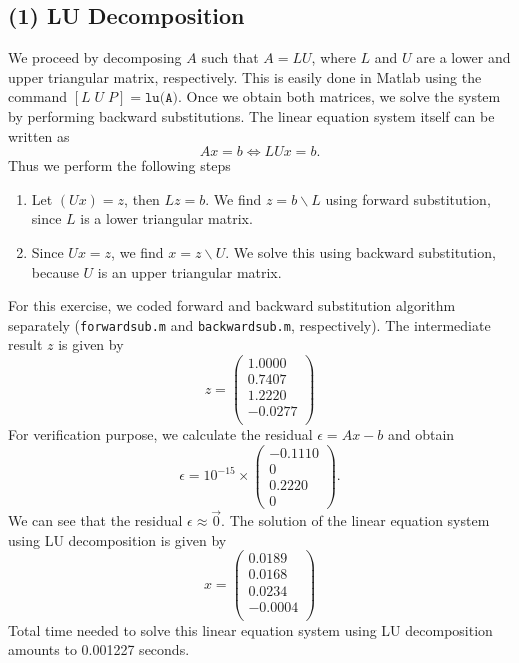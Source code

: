\documentclass[11pt]{article}
\newcommand{\1}{\mathbbm{1}}
\begin{document}
\subsection*{(1) LU Decomposition}
We proceed by decomposing $A$ such that $A=LU$, where $L$ and $U$ are a lower and upper triangular matrix, respectively. This is easily done in Matlab using the command $[L \; U \; P] = \texttt{lu(A)}$. Once we obtain both matrices, we solve the system by performing backward substitutions. The linear equation system itself can be written as 
\[Ax=b \Leftrightarrow LUx =b.\]
Thus we perform the following steps
\begin{enumerate}
	\item Let $(Ux) =z$, then $Lz=b$. We find $z = b\backslash L$ using forward substitution, since $L$ is a lower triangular matrix.
	\item Since $Ux = z$, we find $x=z\backslash U$. We solve this using backward substitution, because $U$ is an upper triangular matrix.
\end{enumerate} 
For this exercise, we coded forward and backward substitution algorithm separately (\texttt{forwardsub.m} and \texttt{backwardsub.m}, respectively). The intermediate result $z$ is given by
\[
z = \begin{pmatrix}
	1.0000\\
	0.7407\\
	1.2220\\
	-0.0277\\
\end{pmatrix}
\]
For verification purpose, we calculate the residual $\epsilon = Ax-b$ and obtain
\[
\epsilon =   10^{-15} \times \begin{pmatrix}
   -0.1110\\
0\\
0.2220\\
0
\end{pmatrix}.
\]
We can see that the residual $\epsilon\approx\vec{0}$. The solution of the linear equation system using LU decomposition is given by
\[x = \begin{pmatrix}
	    0.0189\\
	0.0168\\
	0.0234\\
	-0.0004\\
\end{pmatrix}\]
Total time needed to solve this linear equation system using LU decomposition amounts to 0.001227 seconds.
\end{document}

